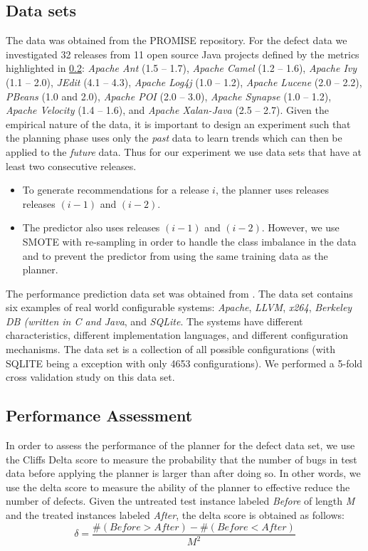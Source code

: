 \documentclass[conference]{IEEEtran}
\newcommand{\keyword}[1]{\textit{#1}}
\begin{document}
\subsection{Data sets}
The data was obtained from the PROMISE repository. For the defect data we investigated 32 releases from 11 open source Java projects defined by the metrics highlighted in \ref{}: \keyword{Apache Ant} (1.5 -- 1.7), \keyword{Apache Camel} (1.2 -- 1.6), \keyword{Apache Ivy} (1.1 -- 2.0), \keyword{JEdit} (4.1 -- 4.3), \keyword{Apache Log4j} (1.0 -- 1.2), \keyword{Apache Lucene} (2.0 -- 2.2), \keyword{PBeans} (1.0 and 2.0), \keyword{Apache POI} (2.0 -- 3.0), \keyword{Apache Synapse} (1.0 -- 1.2), \keyword{Apache Velocity} (1.4 -- 1.6), and \keyword{Apache Xalan-Java} (2.5 -- 2.7). Given the empirical nature of the data, it is important to design an experiment such that the planning phase uses only the \keyword{past} data to learn trends which can then be applied to the \keyword{future} data. Thus for our experiment we use data sets that have at least two consecutive releases. 
\begin{itemize}
\item To generate recommendations for a release $i$, the planner uses releases releases $(i-1)$ and $(i-2)$.
\item The predictor also uses releases $(i-1)$ and $(i-2)$. However, we use SMOTE with re-sampling in order to handle the class imbalance in the data and to prevent the predictor from using the same training data as the planner.
\end{itemize}


The performance prediction data set was obtained from \cite{}. The data set contains six examples of real world configurable systems: \keyword{Apache}, \keyword{LLVM}, \keyword{x264}, \keyword{Berkeley DB (written in C and Java}, and \keyword{SQLite}. The systems have different characteristics, different implementation languages, and different configuration mechanisms. The data set is a collection of all possible configurations (with SQLITE being a exception with only 4653 configurations). We performed a 5-fold cross validation study on this data set.

\subsection{Performance Assessment}

In order to assess the performance of the planner for the defect data set, we use the Cliffs Delta score to measure the probability that the number of bugs in test data before applying the planner is larger than after doing so. In other words, we use the delta score to measure the ability of the planner to effective reduce the number of defects. Given the untreated test instance labeled \textit{Before} of length \textit{M} and the treated instances labeled \textit{After}, the delta score is obtained as follows:
\begin{equation}
\delta = \frac{\#(Before>After) - \#(Before<After)}{M^2}
\end{equation}
\end{document}
